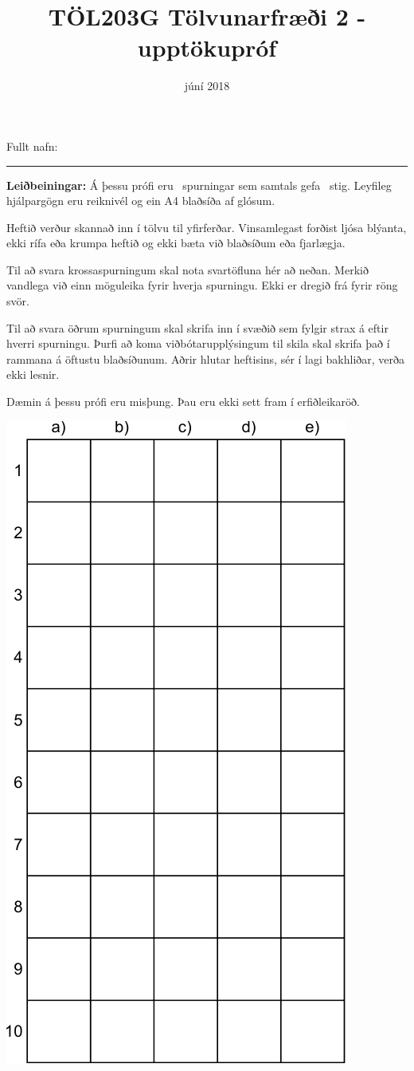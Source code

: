 \documentclass[addpoints]{exam}
\author{}
\date{}
\title{TÖL203G Tölvunarfræði 2 - upptökupróf}
\author{}
\date{júní 2018}
\begin{document}
Fullt nafn: \vspace*{1mm} \hrule

\vspace{1cm}

\textbf{Leiðbeiningar:} Á þessu prófi eru \numquestions\ spurningar sem samtals gefa \numpoints\ stig.
Leyfileg hjálpargögn eru reiknivél og ein A4 blaðsíða af glósum.

Heftið verður skannað inn í tölvu til yfirferðar. Vinsamlegast forðist ljósa blýanta, ekki rífa eða krumpa heftið og ekki bæta við blaðsíðum eða fjarlægja.

Til að svara krossaspurningum skal nota svartöfluna hér að neðan. Merkið vandlega við einn möguleika fyrir hverja spurningu. Ekki er dregið frá fyrir röng svör.

Til að svara öðrum spurningum skal skrifa inn í svæðið sem fylgir strax á eftir hverri spurningu. Þurfi að koma viðbótarupplýsingum til skila skal skrifa það í rammana á
öftustu blaðsíðunum. Aðrir hlutar heftisins, sér í lagi bakhliðar, verða ekki lesnir.

Dæmin á þessu prófi eru misþung. Þau eru ekki sett fram í erfiðleikaröð.

\begin{center}
	\includegraphics[width=0.4\linewidth]{Pics/svartafla}
\end{center}

\newpage
\end{document}

